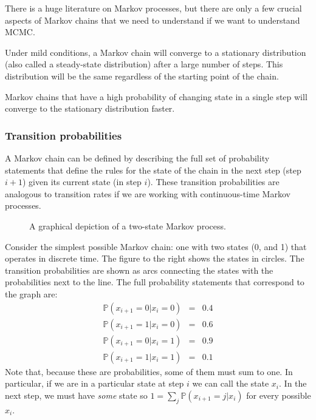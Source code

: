 \documentclass[11pt]{article}
\renewcommand{\Pr}{{\mathbb P}}
\begin{document}
There is a huge literature on Markov processes, but there are only a few crucial aspects of Markov chains that we need to understand if we want to understand MCMC.
\begin{compactitem}
	\item Under mild conditions, a Markov chain will converge to a stationary distribution (also called a steady-state distribution) after a large number of steps. This distribution will be the same regardless of the starting point of the chain.
	\item Markov chains that have a high probability of changing state in a single step will converge to the stationary distribution faster.
\end{compactitem}

\subsubsection*{Transition probabilities}
A Markov chain can be defined by describing the full set of probability statements that define the rules for the state of the chain in the next step (step $i+1$) given its current state (in step $i$).
These transition probabilities are analogous to transition rates if we are working with continuous-time Markov processes.

\begin{figure}
\caption{A graphical depiction of a two-state Markov process.}\label{fig2state}
\end{figure}
Consider the simplest possible Markov chain: one with two states (0, and 1) that operates in discrete time.
The figure to the right shows the states in circles. 
The transition probabilities are shown as arcs connecting the states with the probabilities next to the line.
The full probability statements that correspond to the graph are:
\begin{eqnarray*}
	\Pr(x_{i+1}=0|x_i=0) & = & 0.4\\
	\Pr(x_{i+1}=1|x_i=0) & = & 0.6\\
	\Pr(x_{i+1}=0|x_i=1) & = & 0.9\\
	\Pr(x_{i+1}=1|x_i=1) & = & 0.1
\end{eqnarray*}
Note that, because these are probabilities, some of them must sum to one.
In particular, if we are in a particular state at step $i$ we can call the state $x_i$.  
In the next step, we must have {\em some} state so $1 = \sum_j \Pr(x_{i+1}=j|x_i)$ for every possible $x_i$.
\end{document}
